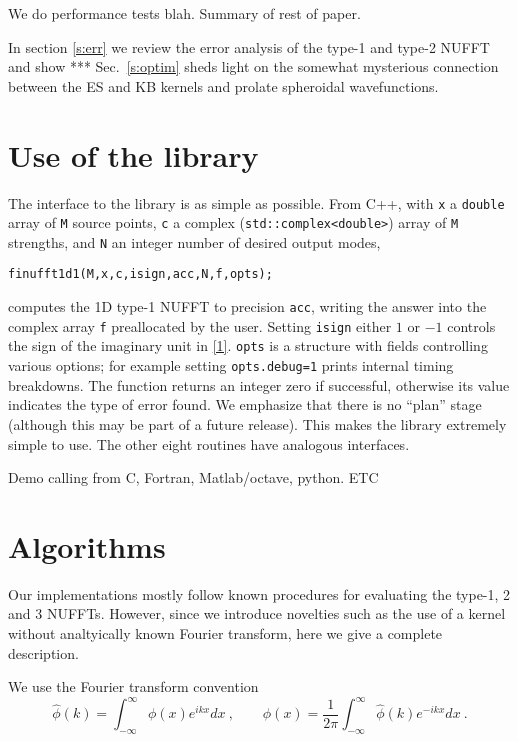 \documentclass[10pt]{article}
\newcommand{\be}{\begin{equation}}
\newcommand{\ee}{\end{equation}}
\newcommand{\intR}{\int_{-\infty}^\infty}
\begin{document}
We do performance tests blah.
Summary of rest of paper.

In section \ref{s:err} we review the error analysis of the type-1 and type-2
NUFFT and show ***
Sec.~\ref{s:optim} sheds light on the somewhat mysterious
connection between the ES and KB kernels and prolate spheroidal wavefunctions.




\section{Use of the library}

The interface to the library is as
simple as possible.
From C++, with {\tt x} a {\tt double} array of {\tt M} source points,
{\tt c} a complex ({\tt std::complex<double>}) array of {\tt M} strengths,
and {\tt N} an integer number of desired output modes,
\begin{verbatim}
finufft1d1(M,x,c,isign,acc,N,f,opts);
\end{verbatim}
computes the 1D type-1 NUFFT to precision {\tt acc}, writing the
answer into the complex array {\tt f} preallocated by the user.
Setting {\tt isign} either $1$ or $-1$ controls the
sign of the imaginary unit in \eqref{1}.
{\tt opts} is a structure with fields controlling various options;
for example setting {\tt opts.debug=1} prints internal timing breakdowns.
The function returns an integer zero if successful, otherwise
its value indicates the type of error found.
We emphasize that there is no ``plan'' stage
(although this may be part of a future release).
This makes the library extremely simple to use.
The other eight routines have analogous interfaces.


Demo calling from C, Fortran, Matlab/octave, python.
ETC


\section{Algorithms}

Our implementations mostly follow known procedures
for evaluating the type-1, 2 and 3 NUFFTs.
However, since we introduce novelties such as the
use of a kernel without analtyically known Fourier transform,
here we give a complete description.

We use the Fourier transform convention
\be
\hat\phi(k) = \intR \phi(x) e^{ikx} dx
~,\qquad
\phi(x) = \frac{1}{2\pi} \intR \hat\phi(k) e^{-ikx} dx
~.
\label{FT}
\ee
\end{document}
